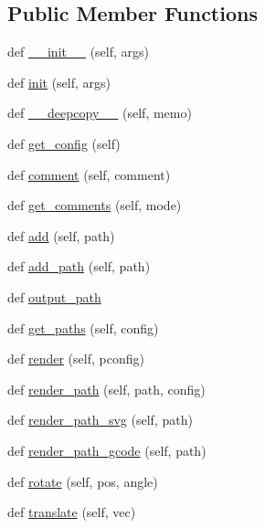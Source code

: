 \subsection*{Public Member Functions}
\begin{DoxyCompactItemize}
\item 
def \hyperlink{classpath_1_1_pathgroup_a6d8fdfd1f6d3e2ac279f9407eb9ccc47}{\+\_\+\+\_\+init\+\_\+\+\_\+} (self, args)
\item 
def \hyperlink{classpath_1_1_pathgroup_a9024aa309df58b977d4eb93e7e5e53c8}{init} (self, args)
\item 
def \hyperlink{classpath_1_1_pathgroup_af3daf2374a35dcf1a96d1f91a96b332d}{\+\_\+\+\_\+deepcopy\+\_\+\+\_\+} (self, memo)
\item 
def \hyperlink{classpath_1_1_pathgroup_ae2d5cd6d4f967daed162e238533bc393}{get\+\_\+config} (self)
\item 
def \hyperlink{classpath_1_1_pathgroup_a7c5d24404c5aecfdc2055a11650ccfb6}{comment} (self, comment)
\item 
def \hyperlink{classpath_1_1_pathgroup_a5014fca4558ad2f5bbce999e68548610}{get\+\_\+comments} (self, mode)
\item 
def \hyperlink{classpath_1_1_pathgroup_af55da85d788596bc6566091c0e457b5b}{add} (self, path)
\item 
def \hyperlink{classpath_1_1_pathgroup_a3ae2d4ec2bec6339076a190879e18bdd}{add\+\_\+path} (self, path)
\item 
def \hyperlink{classpath_1_1_pathgroup_aab3791493c6fcb02fc647f03dea871a6}{output\+\_\+path}
\item 
def \hyperlink{classpath_1_1_pathgroup_a67aa15f33d3db050e065ce7013ae3a3c}{get\+\_\+paths} (self, config)
\item 
def \hyperlink{classpath_1_1_pathgroup_a446ca452a2ea35faef3e51f1e9e4c428}{render} (self, pconfig)
\item 
def \hyperlink{classpath_1_1_pathgroup_af9588530d2d8a8f508254a11d71f7951}{render\+\_\+path} (self, path, config)
\item 
def \hyperlink{classpath_1_1_pathgroup_a3637b74e2a08fc6168667ec8d21bee96}{render\+\_\+path\+\_\+svg} (self, path)
\item 
def \hyperlink{classpath_1_1_pathgroup_ab0393714499705467f3a2edcf8858cd7}{render\+\_\+path\+\_\+gcode} (self, path)
\item 
def \hyperlink{classpath_1_1_pathgroup_a08dd8c8ddcbc0f0fa3d19fc8b548aac3}{rotate} (self, pos, angle)
\item 
def \hyperlink{classpath_1_1_pathgroup_a51342387e37950570ee0f66106d5ee0f}{translate} (self, vec)
\end{DoxyCompactItemize}
